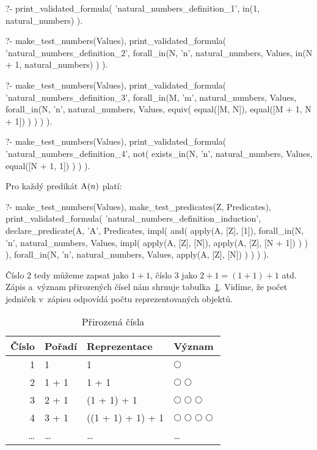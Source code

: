 \begin{fact}
\begin{prolog}
?-	print_validated_formula(
		'natural_numbers_definition_1',
		in(1, natural_numbers)
	).
\end{prolog}
\begin{prolog}
?-	make_test_numbers(Values),
	print_validated_formula(
		'natural_numbers_definition_2',
		forall_in(N, 'n', natural_numbers, Values,
				in(N + 1, natural_numbers)
		)
	).
\end{prolog}
\begin{prolog}
?-	make_test_numbers(Values),
	print_validated_formula(
		'natural_numbers_definition_3',
		forall_in(M, 'm', natural_numbers, Values,
			forall_in(N, 'n', natural_numbers, Values,
				equiv(
					equal([M, N]),				
					equal([M + 1, N + 1])
				)
			)
		)
	).
\end{prolog}
\begin{prolog}
?-	make_test_numbers(Values),
	print_validated_formula(
		'natural_numbers_definition_4',
		not(
			exists_in(N, 'n', natural_numbers, Values,
				equal([N + 1, 1])
			)
		)
	).
\end{prolog}
Pro každý predikát \(\mathrm{A}(n)\) platí:
\begin{prolog}
?-	make_test_numbers(Values),
	make_test_predicates(Z, Predicates),
	print_validated_formula(
		'natural_numbers_definition_induction',
		declare_predicate(A, 'A', Predicates,
			impl(			
				and(
					apply(A, [Z], [1]),
					forall_in(N, 'n', natural_numbers, Values,
						impl(
							apply(A, [Z], [N]),
							apply(A, [Z], [N + 1])
						)
					)
				),
				forall_in(N, 'n', natural_numbers, Values,
					apply(A, [Z], [N])
				)
			)
		)
	).
\end{prolog}
\end{fact}

Číslo 2 tedy můžeme zapsat jako \(1 + 1\), číslo 3 jako \(2 + 1 = (1 + 1) + 1\) atd. Zápis a~význam přirozených čísel nám shrnuje tabulka~\ref{tab:natural_numbers}. Vidíme, že počet jedniček v~zápisu odpovídá počtu reprezentovaných objektů.

\begin{table}[ht]
\centering
\begin{tabular}{|r|l|l|l|}
\hline
Číslo & Pořadí & Reprezentace & Význam \\
\hline
1 & 1 & 1 & \(\bigcirc\) \\
2 & 1 + 1 & 1 + 1 & \(\bigcirc \bigcirc\) \\
3 & 2 + 1 & (1 + 1) + 1 & \(\bigcirc \bigcirc \bigcirc\) \\
4 & 3 + 1 & ((1 + 1) + 1) + 1 & \(\bigcirc \bigcirc \bigcirc \bigcirc\) \\
\ldots & \ldots & \ldots & \ldots \\
\hline
\end{tabular}
\caption{Přirozená čísla}
\label{tab:natural_numbers}
\end{table}

